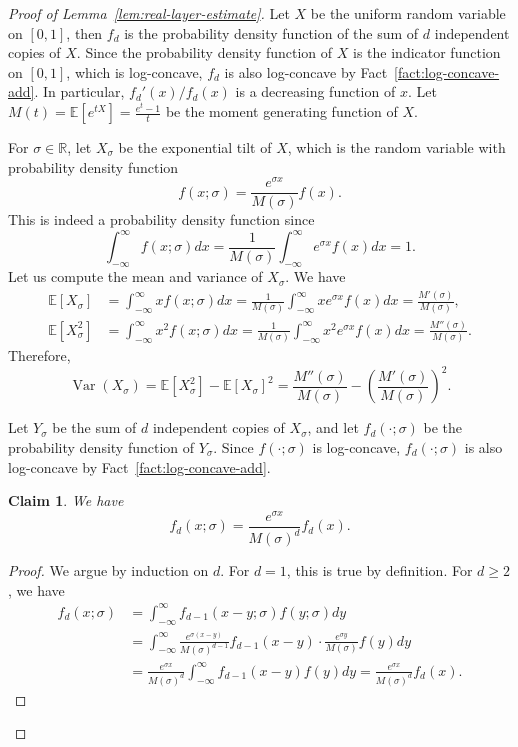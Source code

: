 \documentclass[10pt,a4paper]{amsart}
\newtheorem{claim}{Claim}
\newcommand{\EE}{\mathbb{E}}
\newcommand{\RR}{\mathbb{R}}
\DeclareMathOperator{\Var}{Var}
\newcommand{\paren}[1]{\left( #1 \right)}
\begin{document}
\begin{proof}[Proof of Lemma~\ref{lem:real-layer-estimate}]
    Let $X$ be the uniform random variable on $[0,1]$, then $f_d$ is the probability density function of the sum of $d$ independent copies of $X$. Since the probability density function of $X$ is the indicator function on $[0,1]$, which is log-concave, $f_d$ is also log-concave by Fact~\ref{fact:log-concave-add}. In particular, $f_d'(x)/f_d(x)$ is a decreasing function of $x$. Let $M(t)=\EE[e^{tX}]=\frac{e^t-1}{t}$ be the moment generating function of $X$.

    For $\sigma\in\RR$, let $X_\sigma$ be the exponential tilt of $X$, which is the random variable with probability density function
    \[f(x;\sigma) = \frac{e^{\sigma x}}{M(\sigma)}f(x).\]
    This is indeed a probability density function since
    \[\int_{-\infty}^\infty f(x;\sigma)dx = \frac{1}{M(\sigma)}\int_{-\infty}^{\infty} e^{\sigma x}f(x)dx = 1.\]
    Let us compute the mean and variance of $X_\sigma$. We have
    \begin{align*}
        \EE[X_\sigma] &= \int_{-\infty}^\infty xf(x;\sigma)dx = \frac{1}{M(\sigma)}\int_{-\infty}^\infty xe^{\sigma x}f(x)dx = \frac{M'(\sigma)}{M(\sigma)}, \\
        \EE[X_\sigma^2] &= \int_{-\infty}^\infty x^2f(x;\sigma)dx = \frac{1}{M(\sigma)}\int_{-\infty}^\infty x^2e^{\sigma x}f(x)dx = \frac{M''(\sigma)}{M(\sigma)}.
    \end{align*}
    Therefore, 
    \[\Var(X_\sigma) = \EE[X_\sigma^2] - \EE[X_\sigma]^2 = \frac{M''(\sigma)}{M(\sigma)} - \paren{\frac{M'(\sigma)}{M(\sigma)}}^2.\]

    Let $Y_\sigma$ be the sum of $d$ independent copies of $X_\sigma$, and let $f_d(\cdot;\sigma)$ be the probability density function of $Y_\sigma$. Since $f(\cdot;\sigma)$ is log-concave, $f_d(\cdot;\sigma)$ is also log-concave by Fact~\ref{fact:log-concave-add}. 

    \begin{claim}
        We have
        \[f_d(x;\sigma) = \frac{e^{\sigma x}}{M(\sigma)^d}f_d(x).\]
    \end{claim}
    \begin{proof}
        We argue by induction on $d$. For $d=1$, this is true by definition. For $d\geq 2$, we have
        \begin{align*}
            f_d(x;\sigma) &= \int_{-\infty}^\infty f_{d-1}(x-y;\sigma)f(y;\sigma)dy \\
            &= \int_{-\infty}^\infty \frac{e^{\sigma (x-y)}}{M(\sigma)^{d-1}}f_{d-1}(x-y) \cdot \frac{e^{\sigma y}}{M(\sigma)}f(y) dy \\
            &= \frac{e^{\sigma x}}{M(\sigma)^d} \int_{-\infty}^\infty f_{d-1}(x-y)f(y) dy = \frac{e^{\sigma x}}{M(\sigma)^d}f_d(x).
        \end{align*}
    \end{proof}


\end{proof}
\end{document}
